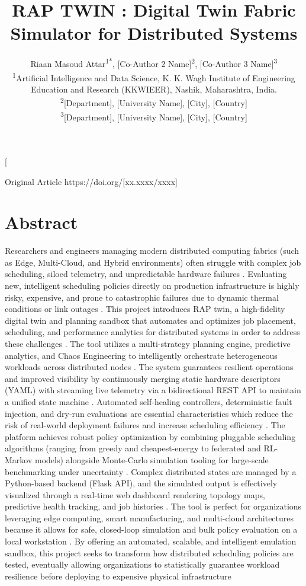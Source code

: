 \documentclass[twoside,twocolumn,10pt]{article}
\title{\fontsize{16}{20}\selectfont\textbf{RAP TWIN : Digital Twin Fabric Simulator for Distributed Systems}}
\author{
    \fontsize{12}{14}\selectfont
    Riaan Masoud Attar\textsuperscript{1*}, [Co-Author 2 Name]\textsuperscript{2}, [Co-Author 3 Name]\textsuperscript{3}\\[1ex]
    \fontsize{10}{12}\selectfont
    \textsuperscript{1}Artificial Intelligence and Data Science, K. K. Wagh Institute of Engineering Education and Research (KKWIEER), Nashik, Maharashtra, India.\\
    \textsuperscript{2}[Department], [University Name], [City], [Country]\\
    \textsuperscript{3}[Department], [University Name], [City], [Country]
}
\date{}
\begin{document}
\twocolumn[
\begin{@twocolumnfalse}

\vspace{-0.7cm}
{\noindent\raggedright
{\fontsize{11}{13}\selectfont Original Article}
\hfill
{\fontsize{11}{13}\selectfont\footnotesize https://doi.org/[xx.xxxx/xxxx]}
\par}

\vspace{-0.5cm}

\maketitle
\thispagestyle{firstpage}

\section*{\hspace{-1.5mm}Abstract}
\fontsize{10}{12}\selectfont
\justifying
\noindent
Researchers and engineers managing modern distributed computing fabrics (such as Edge, Multi-Cloud, and Hybrid environments) often struggle with complex job scheduling, siloed telemetry, and unpredictable hardware failures
. Evaluating new, intelligent scheduling policies directly on production infrastructure is highly risky, expensive, and prone to catastrophic failures due to dynamic thermal conditions or link outages
. This project introduces RAP twin, a high-fidelity digital twin and planning sandbox that automates and optimizes job placement, scheduling, and performance analytics for distributed systems in order to address these challenges
. The tool utilizes a multi-strategy planning engine, predictive analytics, and Chaos Engineering to intelligently orchestrate heterogeneous workloads across distributed nodes
. The system guarantees resilient operations and improved visibility by continuously merging static hardware descriptors (YAML) with streaming live telemetry via a bidirectional REST API to maintain a unified state machine
. Automated self-healing controllers, deterministic fault injection, and dry-run evaluations are essential characteristics which reduce the risk of real-world deployment failures and increase scheduling efficiency
. The platform achieves robust policy optimization by combining pluggable scheduling algorithms (ranging from greedy and cheapest-energy to federated and RL-Markov models) alongside Monte-Carlo simulation tooling for large-scale benchmarking under uncertainty
. Complex distributed states are managed by a Python-based backend (Flask API), and the simulated output is effectively visualized through a real-time web dashboard rendering topology maps, predictive health tracking, and job histories
. The tool is perfect for organizations leveraging edge computing, smart manufacturing, and multi-cloud architectures because it allows for safe, closed-loop simulation and bulk policy evaluation on a local workstation
. By offering an automated, scalable, and intelligent emulation sandbox, this project seeks to transform how distributed scheduling policies are tested, eventually allowing organizations to statistically guarantee workload resilience before deploying to expensive physical infrastructure


\end{@twocolumnfalse}
\end{document}
